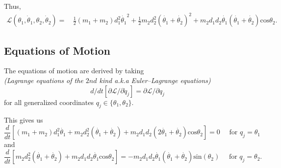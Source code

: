 \documentclass[12pt]{article}
\begin{document}
\vspace{1ex}
Thus, 
\begin{equation*}
\begin{split}
\mathcal{L}(\theta_1, \dot \theta_1, \theta_2, \dot \theta_2) = &\,\frac{1}{2} (m_1 + m_2) d_1^2 \dot{\theta_1}^2 
             + \frac{1}{2} m_2 d_2^2 (\dot{\theta_1} + \dot{\theta_2})^2
             + m_2 d_1 d_2 \dot{\theta_1} (\dot{\theta_1} + \dot{\theta_2}) \mathrm{cos}\theta_2.
\end{split}
\end{equation*}

\subsection*{Equations of Motion}
The equations of motion are derived by taking\\ {\it(Lagrange equations of the $2nd$ kind a.k.a Euler--Lagrange equations)}
$$d/dt [ \partial\mathcal{L}/\partial \dot q_j ] = \partial\mathcal{L}/\partial q_j$$
for all generalized coordinates $q_j \in \{\theta_1, \theta_2 \}$.

This gives us
$$\frac{d}{dt}\left[(m_1 + m_2) d_1^2 \dot{\theta_1} 
             + m_2 d_2^2 (\dot{\theta_1} + \dot{\theta_2})
             + m_2 d_1 d_2 (2 \dot{\theta_1} + \dot{\theta_2}) \mathrm{cos}\theta_2\right] = 0 \quad \text{ for } q_j = \theta_1$$
and
\begin{equation*}
 \frac{d}{dt}\left[m_2 d_2^2 (\dot{\theta_1} + \dot{\theta_2})
             + m_2 d_1 d_2 \dot{\theta_1} \mathrm{cos}\theta_2 \right] = 
  - m_2 d_1 d_2 \dot{\theta_1} (\dot{\theta_1} + \dot{\theta_2}) \mathrm{sin}(\theta_2) \quad \text{ for } q_j = \theta_2.
\end{equation*}
\end{document}
